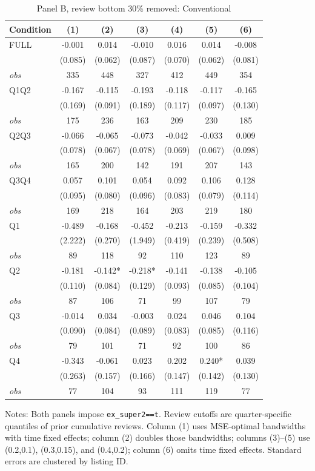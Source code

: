 \begin{table}[!htbp]
\centering
\caption{Panel B, review bottom 30\% removed: Conventional}
\begin{tabular}{lcccccc}
\toprule
Condition & (1) & (2) & (3) & (4) & (5) & (6) \\
\midrule
FULL & -0.001 & 0.014 & -0.010 & 0.016 & 0.014 & -0.008 \\
 & (0.085) & (0.062) & (0.087) & (0.070) & (0.062) & (0.081) \\
\textit{obs} & 335 & 448 & 327 & 412 & 449 & 354 \\
Q1Q2 & -0.167 & -0.115 & -0.193 & -0.118 & -0.117 & -0.165 \\
 & (0.169) & (0.091) & (0.189) & (0.117) & (0.097) & (0.130) \\
\textit{obs} & 175 & 236 & 163 & 209 & 230 & 185 \\
Q2Q3 & -0.066 & -0.065 & -0.073 & -0.042 & -0.033 & 0.009 \\
 & (0.078) & (0.067) & (0.078) & (0.069) & (0.067) & (0.098) \\
\textit{obs} & 165 & 200 & 142 & 191 & 207 & 143 \\
Q3Q4 & 0.057 & 0.101 & 0.054 & 0.092 & 0.106 & 0.128 \\
 & (0.095) & (0.080) & (0.096) & (0.083) & (0.079) & (0.114) \\
\textit{obs} & 169 & 218 & 164 & 203 & 219 & 180 \\
Q1 & -0.489 & -0.168 & -0.452 & -0.213 & -0.159 & -0.332 \\
 & (2.222) & (0.270) & (1.949) & (0.419) & (0.239) & (0.508) \\
\textit{obs} & 89 & 118 & 92 & 110 & 123 & 89 \\
Q2 & -0.181 & -0.142* & -0.218* & -0.141 & -0.138 & -0.105 \\
 & (0.110) & (0.084) & (0.129) & (0.093) & (0.085) & (0.104) \\
\textit{obs} & 87 & 106 & 71 & 99 & 107 & 79 \\
Q3 & -0.014 & 0.034 & -0.003 & 0.024 & 0.046 & 0.104 \\
 & (0.090) & (0.084) & (0.089) & (0.083) & (0.085) & (0.116) \\
\textit{obs} & 79 & 101 & 71 & 92 & 100 & 86 \\
Q4 & -0.343 & -0.061 & 0.023 & 0.202 & 0.240* & 0.039 \\
 & (0.263) & (0.157) & (0.166) & (0.147) & (0.142) & (0.130) \\
\textit{obs} & 77 & 104 & 93 & 111 & 119 & 77 \\
\bottomrule
\end{tabular}
\begin{minipage}{0.98\textwidth}\footnotesize
Notes: Both panels impose \texttt{ex\_super2==t}. Review cutoffs are quarter-specific quantiles of prior cumulative reviews. Column (1) uses MSE-optimal bandwidths with time fixed effects; column (2) doubles those bandwidths; columns (3)--(5) use (0.2,0.1), (0.3,0.15), and (0.4,0.2); column (6) omits time fixed effects. Standard errors are clustered by listing ID.
\end{minipage}
\end{table}

